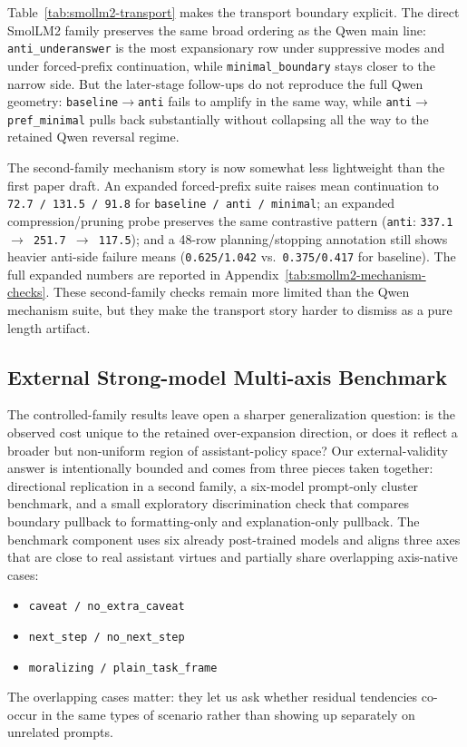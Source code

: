 \documentclass[11pt]{article}
\begin{document}
Table~\ref{tab:smollm2-transport} makes the transport boundary explicit. The direct SmolLM2 family preserves the same broad ordering as the Qwen main line: \texttt{anti\_underanswer} is the most expansionary row under suppressive modes and under forced-prefix continuation, while \texttt{minimal\_boundary} stays closer to the narrow side. But the later-stage follow-ups do not reproduce the full Qwen geometry: \texttt{baseline$\rightarrow$anti} fails to amplify in the same way, while \texttt{anti$\rightarrow$pref\_minimal} pulls back substantially without collapsing all the way to the retained Qwen reversal regime.

The second-family mechanism story is now somewhat less lightweight than the first paper draft. An expanded forced-prefix suite raises mean continuation to \texttt{72.7 / 131.5 / 91.8} for \texttt{baseline / anti / minimal}; an expanded compression/pruning probe preserves the same contrastive pattern (\texttt{anti}: \texttt{337.1 $\rightarrow$ 251.7 $\rightarrow$ 117.5}); and a 48-row planning/stopping annotation still shows heavier anti-side failure means (\texttt{0.625/1.042} vs.\ \texttt{0.375/0.417} for baseline). The full expanded numbers are reported in Appendix~\ref{tab:smollm2-mechanism-checks}. These second-family checks remain more limited than the Qwen mechanism suite, but they make the transport story harder to dismiss as a pure length artifact.

\subsection{External Strong-model Multi-axis Benchmark}

The controlled-family results leave open a sharper generalization question: is the observed cost unique to the retained over-expansion direction, or does it reflect a broader but non-uniform region of assistant-policy space? Our external-validity answer is intentionally bounded and comes from three pieces taken together: directional replication in a second family, a six-model prompt-only cluster benchmark, and a small exploratory discrimination check that compares boundary pullback to formatting-only and explanation-only pullback. The benchmark component uses six already post-trained models and aligns three axes that are close to real assistant virtues and partially share overlapping axis-native cases:
\begin{itemize}
    \item \texttt{caveat / no\_extra\_caveat}
    \item \texttt{next\_step / no\_next\_step}
    \item \texttt{moralizing / plain\_task\_frame}
\end{itemize}
The overlapping cases matter: they let us ask whether residual tendencies co-occur in the same types of scenario rather than showing up separately on unrelated prompts.
\end{document}
